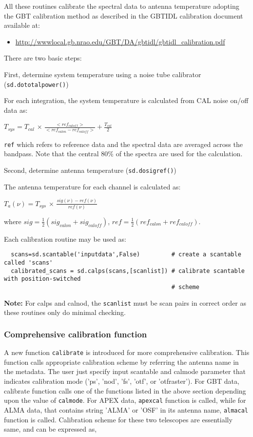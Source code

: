 All these routines calibrate the spectral data to antenna temperature
adopting the GBT calibration method as described in the
GBTIDL calibration document available at: 
\begin{itemize}
   \item \url{http://wwwlocal.gb.nrao.edu/GBT/DA/gbtidl/gbtidl_calibration.pdf}
\end{itemize}
There are two basic steps:

First, determine system temperature using a noise tube calibrator
({\tt sd.dototalpower()}) 

For each integration, the system temperature is calculated from
CAL noise on/off data as:

$ T_{sys} = T_{cal}$ $\times$ 
$\frac{<ref_{caloff}>}{<ref_{calon} - ref_{caloff}>} + \frac{T_{cal}}{2} $

{\tt ref} which refers to reference data and the spectral data are averaged
across the bandpass.  Note that the central 80\% of the spectra are
used for the calculation.

Second, determine antenna temperature ({\tt sd.dosigref()})

The antenna temperature for each channel is calculated as:

$ T_a(\nu) = T_{sys}$ $\times$ 
$\frac{sig(\nu) - ref(\nu)}{ref(\nu)}$

where $sig = \frac{1}{2}(sig_{calon} + sig_{caloff})$, 
      $ref = \frac{1}{2}(ref_{calon} + ref_{caloff}).$


Each calibration routine may be used as:


\small
\begin{verbatim}
  scans=sd.scantable('inputdata',False)         # create a scantable called 'scans'
  calibrated_scans = sd.calps(scans,[scanlist]) # calibrate scantable with position-switched 
                                                # scheme
\end{verbatim}
\normalsize


{\bf Note:} For calps and calnod, the {\tt scanlist} must be scan pairs in
correct order as these routines only do minimal checking.

\subsubsection{Comprehensive calibration function}
A new function {\tt calibrate} is introduced for more comprehensive
calibration. This function calls appropriate calibration scheme by
referring the antenna name in the metadata. The user just specify input
scantable and calmode parameter that indicates calibration mode ('ps',
'nod', 'fs', 'otf', or 'otfraster'). For GBT data, calibrate function calls one of
the functions listed in the above section depending upon the value of
{\tt calmode}. For APEX data, {\tt apexcal} function is called, while for ALMA
data, that contains string 'ALMA' or 'OSF' in its antenna name, {\tt almacal}
function is called. Calibration scheme for these two telescopes are
essentially same, and can be expressed as,

